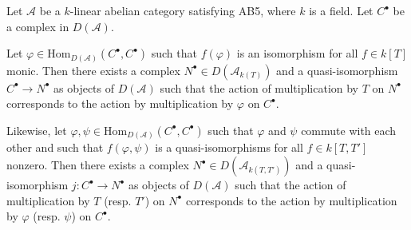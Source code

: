 \documentclass{amsart}
\begin{document}
\begin{lemma}\label{simpler2}
Let $\mathcal{A}$ be a $k$-linear abelian category satisfying AB5, where $k$ is a field. Let $C^\bullet$ be a complex in $D(\mathcal{A})$. 

Let $\varphi \in \mathrm{Hom}_{D(\mathcal{A})}(C^\bullet, C^\bullet)$ such that $f(\varphi)$ is an isomorphism for all $f\in k[T]$ monic. Then there exists a complex
$N^{\bullet}\in D(\mathcal{A}_{k(T)})$ and a quasi-isomorphism $C^\bullet \to N^\bullet$ as objects of $D(\mathcal{A})$ such that the action of multiplication by $T$ on $N^\bullet$ corresponds to the action by multiplication by $\varphi$ on $C^\bullet$.

Likewise, let $\varphi, \psi \in \mathrm{Hom}_{D(\mathcal{A})}(C^\bullet, C^\bullet)$ such that $\varphi$ and $\psi$ commute with each other and such that $f(\varphi,\psi)$ is a quasi-isomorphisms for all $f\in k[T,T']$ nonzero. Then there exists a complex
$N^{\bullet}\in D(\mathcal{A}_{k(T,T')})$ and a quasi-isomorphism
$j : C^\bullet \to N^\bullet$ as objects of $D(\mathcal{A})$ such that the action of multiplication by $T$ (resp. $T'$) on $N^\bullet$ corresponds to the action by multiplication by $\varphi$ (resp. $\psi$) on $C^\bullet$.\end{lemma}
\end{document}
